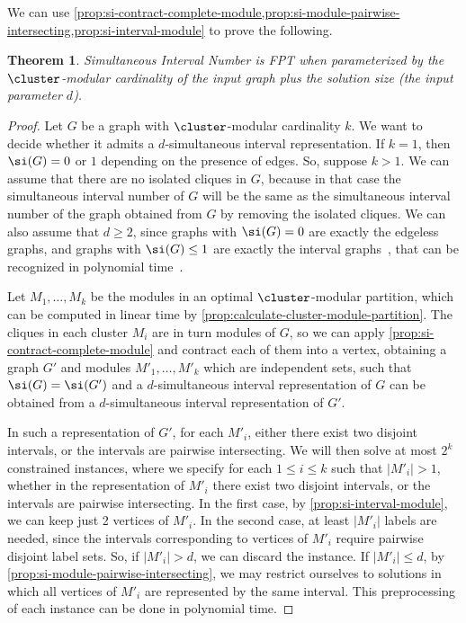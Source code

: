 \documentclass[11pt]{article}
\theoremstyle{plain}
\newtheorem{theorem}{Theorem}
\theoremstyle{definition}
\theoremstyle{remark}
\newcommand{\FPT}{{\smaller[0.83]\textsf{\textup{FPT}}}\xspace}
\begin{document}
We can use \cref{prop:si-contract-complete-module,prop:si-module-pairwise-intersecting,prop:si-interval-module} to prove the following. 
\begin{theorem}
    \label{theorem:si-param-cm}
    {\sc Simultaneous Interval Number} is \FPT when parameterized by the $\cluster$-modular cardinality of the input graph plus the solution size {(the input parameter $d$)}.
\end{theorem}
\begin{proof}
    Let $G$ be a graph with $\cluster$-modular cardinality $k$. We want to decide whether it admits a $d$-simultaneous interval representation. If $k=1$, then $\si(G) = 0$ or $1$ depending on the presence of edges. So, suppose $k > 1$. We can assume that there are no isolated cliques in $G$, because in that case the simultaneous interval number of $G$ will be the same as the simultaneous interval number of the graph obtained from $G$ by removing the isolated cliques. We can also assume that $d \geq 2$, since graphs with $\si(G) = 0$ are exactly the edgeless graphs, and graphs with $\si(G) \leq 1$ are exactly the interval graphs~\citep{Milanic-sim}, that can be recognized in polynomial time~\citep{Habib-interval-rec}. 
    
    Let $M_1, \dots, M_k$ be the modules in an optimal $\cluster$-modular partition, which can be computed in linear time by \cref{prop:calculate-cluster-module-partition}. The cliques in each cluster $M_i$ are in turn modules of $G$, so we can apply \cref{prop:si-contract-complete-module} and contract each of them into a vertex, obtaining a graph $G'$ and modules $M'_1, \dots, M'_k$ which are independent sets, such that $\si(G)=\si(G')$ and a $d$-simultaneous interval representation of $G$ can be obtained from a $d$-simultaneous interval representation of $G'$. 
    
    In such a representation of $G'$, for each $M'_i$, either there exist two disjoint intervals, or the intervals are pairwise intersecting. We will then solve at most $2^k$ constrained instances, where we specify for each $1 \leq i \leq k$ such that $|M'_i|>1$, whether in the representation of $M'_i$ there exist two disjoint intervals, or the intervals are pairwise intersecting. In the first case, by \cref{prop:si-interval-module}, we can keep just 2 vertices of $M'_i$. In the second case, at least $|M'_i|$ labels are needed, since the intervals corresponding to vertices of $M'_i$ require pairwise disjoint label sets. So, if $|M'_i| > d$, we can discard the instance. If $|M'_i| \leq d$, by \cref{prop:si-module-pairwise-intersecting}, we may restrict ourselves to solutions in which all vertices of $M'_i$ are represented by the same interval. This preprocessing of each instance can be done in polynomial time.    


\end{proof}
\end{document}

